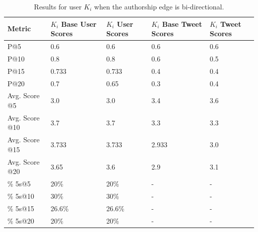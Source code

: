 \begin{table}
\centering
\begin{tabular}{l|p{2.2cm}|p{2.2cm}|p{2.2cm}|p{2.2cm}}
{\bf Metric} & {\bf $K_{i}$ Base User Scores} & {\bf $K_{i}$ User Scores} & {\bf $K_{i}$ Base Tweet Scores} & {\bf $K_{i}$ Tweet Scores} \\ \hline
P@5   & 0.6 & 0.6 & 0.6 & 0.6 \\ \hline
P@10 & 0.8 & 0.8 & 0.6 & 0.5 \\ \hline
P@15 & 0.733 & 0.733 & 0.4 & 0.4 \\ \hline
P@20 & 0.7 & 0.65 & 0.3 & 0.4 \\ \hline

Avg. Score @5   & 3.0 & 3.0 & 3.4 & 3.6 \\ \hline
Avg. Score @10 & 3.7 & 3.7 & 3.3 & 3.3 \\ \hline
Avg. Score @15 & 3.733 & 3.733 & 2.933 & 3.0 \\ \hline
Avg. Score @20 & 3.65 & 3.6 & 2.9 & 3.1 \\ \hline

\% 5s@5    & 20\% & 20\% & - & - \\ \hline
\% 5s@10  & 30\% & 30\% & - & - \\ \hline
\% 5s@15  & 26.6\% & 26.6\% & - & - \\ \hline
\% 5s@20  & 20\% & 20\% & - & - \\
\end{tabular}
\caption{Results for user $K_{i}$ when the authorship edge is bi-directional.}
\label{tab:BiDirectionalAuthorKi}
\end{table}



